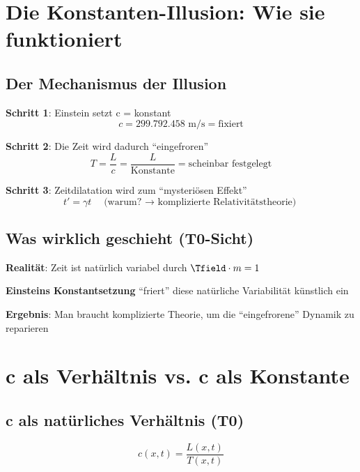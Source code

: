 	\section{Die Konstanten-Illusion: Wie sie funktioniert}
	
	\subsection{Der Mechanismus der Illusion}
	
	\textbf{Schritt 1}: Einstein setzt c = konstant
	\begin{equation}
		c = 299.792.458 \text{ m/s} = \text{fixiert}
	\end{equation}
	
	\textbf{Schritt 2}: Die Zeit wird dadurch ``eingefroren''
	\begin{equation}
		T = \frac{L}{c} = \frac{L}{\text{Konstante}} = \text{scheinbar festgelegt}
	\end{equation}
	
	\textbf{Schritt 3}: Zeitdilatation wird zum ``mysteriösen Effekt''
	\begin{equation}
		t' = \gamma t \quad \text{(warum? $\rightarrow$ komplizierte Relativitätstheorie)}
	\end{equation}
	
	\subsection{Was wirklich geschieht (T0-Sicht)}
	
	\textbf{Realität}: Zeit ist natürlich variabel durch $\Tfield \cdot m = 1$
	
	\textbf{Einsteins Konstantsetzung} ``friert'' diese natürliche Variabilität künstlich ein
	
	\textbf{Ergebnis}: Man braucht komplizierte Theorie, um die ``eingefrorene'' Dynamik zu reparieren
	
	\section{c als Verhältnis vs. c als Konstante}
	
	\subsection{c als natürliches Verhältnis (T0)}
	
	\begin{equation}
		c(x,t) = \frac{L(x,t)}{T(x,t)}
	\end{equation}
	
